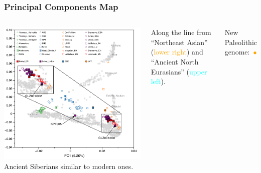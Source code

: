 \documentclass[pdftex,12pt,dvipsnames]{beamer}
\begin{document}
\begin{frame}
  \frametitle{Principal Components Map}
  \begin{columns}
    \includegraphics[width=1.1\linewidth]{yu20-pca.png}
    \raggedleft
    Ancient Siberians similar to modern ones.

    \bigskip

    Along the line from ``Northeast Asian''
    (\textcolor{orange}{lower right}) and ``Ancient
    North Eurasians'' (\textcolor{cyan}{upper left}).


    \bigskip

    New Paleolithic genome:~\textcolor{orange}{$\bullet$}

  \end{columns}
\end{frame}
\end{document}

